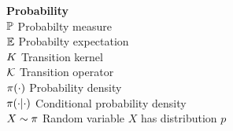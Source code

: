 {\bf {\large Probability}}\\
$\mathbb{P} \dotfill$ Probabilty measure\\
$\mathbb{E} \dotfill$ Probabilty expectation\\
$K \dotfill$ Transition kernel\\
$\K \dotfill$ Transition operator\\
$\pi(\cdot) \dotfill$ Probability density\\
$\pi(\cdot|\cdot) \dotfill$ Conditional probability density\\
$X\sim \pi \dotfill$ Random variable $X$ has distribution $p$ \\
\pagebreak
